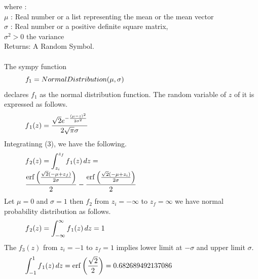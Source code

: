 \documentclass[10pt,journal,compsoc]{IEEEtran} \ifCLASSOPTIONcompsoc
\begin{document}
\noindent where :	\\ $\mu$    : Real number or a list representing the mean or the mean vector \\ $\sigma$ : Real number or a positive definite square matrix, \\ $\sigma^{2} > 0 $ the variance \\ Returns: A Random Symbol. \\ \\ 
\noindent The sympy function 
\begin{equation}
\begin{minipage}{300pt}
 $\displaystyle f_{1} = NormalDistribution(\mu, \sigma)$  
\end{minipage}
\end{equation}
\noindent declares $f_{1} $ as the normal distribution function. The random     variable of $z $ of it is expressed as follows.
\begin{equation}
\begin{minipage}{300pt}
 $\displaystyle f{_1}(z) = \frac{\sqrt{2} e^{- \frac{\left(\mu - z\right)^{2}}{2 \sigma^{2}}}}{2 \sqrt{\pi} \sigma}$  
\end{minipage}
\end{equation}
\noindent Integratinng (3), we have the following.
\begin{equation}
\begin{minipage}{300pt}
 $\displaystyle f{_2}(z) = \int_{z_{i}}^{z_{f}} f{_1}(z)\, dz = \\ \frac{\operatorname{erf}{\left (\frac{\sqrt{2} \left(- \mu + z_{f}\right)}{2 \sigma} \right )}}{2} - \frac{\operatorname{erf}{\left (\frac{\sqrt{2} \left(- \mu + z_{i}\right)}{2 \sigma} \right )}}{2}$  
\end{minipage}
\end{equation}
\noindent Let $\mu = 0 $ and $\sigma = 1 $ then  $f_{2} $ from $z_{i} = -\infty $ to $z_{f} = \infty $ we have normal probability    distribution as follows.
\begin{equation}
\begin{minipage}{300pt}
 $\displaystyle f{_2}(z) = \int_{-\infty}^{\infty} f{_1}(z)\, dz = 1$  
\end{minipage}
\end{equation}
\noindent The $f{_3}(z) $ from $z_{i} = -1 $ to $z_{f} = 1 $ implies    lower limit at $- \sigma $ and upper limit $\sigma $. 
\begin{equation}
\begin{minipage}{300pt}
 $\displaystyle \int_{-1}^{1} f{_1}(z)\, dz = \operatorname{erf}{\left (\frac{\sqrt{2}}{2} \right )} = 0.682689492137086$  
\end{minipage}
\end{equation}
\end{document}
